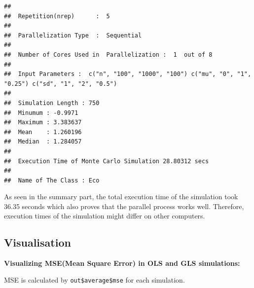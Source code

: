 \documentclass[11pt,a4paper]{article}
\begin{document}
\begin{verbatim}
## 
##  Repetition(nrep)      :  5 
## 
##  Parallelization Type  :  Sequential 
## 
##  Number of Cores Used in  Parallelization :  1  out of 8 
## 
##  Input Parameters :  c("n", "100", "1000", "100") c("mu", "0", "1", "0.25") c("sd", "1", "2", "0.5") 
## 
##  Simulation Length : 750 
##  Minumum : -0.9971 
##  Maximum : 3.383637 
##  Mean    : 1.260196 
##  Median  : 1.284057 
## 
##  Execution Time of Monte Carlo Simulation 28.80312 secs 
## 
##  Name of The Class : Eco
\end{verbatim}

As seen in the summary part, the total execution time of the simulation
took 36.35 seconds which also proves that the parallel process works
well. Therefore, execution times of the simulation might differ on other
computers.

\hypertarget{visualisation}{%
\subsection{Visualisation}\label{visualisation}}

\textbf{Visualizing MSE(Mean Square Error) in OLS and GLS simulations:}

MSE is calculated by \texttt{out\$average\$mse} for each simulation.
\end{document}
